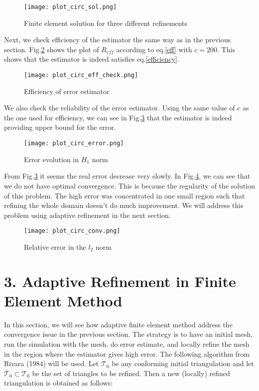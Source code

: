 \documentclass[11pt, letterpaper, hidelinks]{article}
\theoremstyle{definition}
\begin{document}
\begin{figure}[H]
    \texttt{[image: plot\_circ\_sol.png]}
    \centering
    \caption{Finite element solution for three different refinements}
    \label{fig:circ_sol}
\end{figure}

Next, we check efficiency of the estimator the same way as in the previous section. Fig.\ref{fig:circ_eff_check} shows the plot of $R_{eff}$ according to eq.\ref{eff} with $c=200$. This shows that the estimator is indeed satisfies eq.\ref{efficiency}.

\begin{figure}[H]
    \texttt{[image: plot\_circ\_eff\_check.png]}
    \centering
    \caption{Efficiency of error estimator}
    \label{fig:circ_eff_check}
\end{figure}

We also check the reliability of the error estimator. Using the same value of $c$ as the one used for efficiency, we can see in Fig.\ref{fig:circ_error} that the estimator is indeed providing upper bound for the error.

\begin{figure}[H]
    \texttt{[image: plot\_circ\_error.png]}
    \centering
    \caption{Error evolution in $H_1$ norm}
    \label{fig:circ_error}
\end{figure}
From Fig.\ref{fig:circ_error} it seems the real error decrease very slowly. In Fig.\ref{fig:circ_conv}, we can see that we do not have optimal convergence. This is because the regularity of the solution of this problem. The high error was concentrated in one small region such that refining the whole domain doesn't do much improvement. We will address this problem using adaptive refinement in the next section.
\begin{figure}[H]
    \texttt{[image: plot\_circ\_conv.png]}
    \centering
    \caption{Relative error in the $l_2$ norm}
    \label{fig:circ_conv}
\end{figure}

\section{3. Adaptive Refinement in Finite Element Method}
In this section, we will see how adaptive finite element method address the convergence issue in the previous section. The strategy is to have an initial mesh, run the simulation with the mesh, do error estimate, and locally refine the mesh in the region where the estimator gives high error. The following algorithm from Rivara (1984) will be used. Let $\mathcal{T}_0$ be any conforming initial triangulation and let $\bar{\mathcal{T}}_0 \subset \mathcal{T}_0$ be the set of triangles to be refined. Then a new (locally) refined triangulation is obtained as follows:
\end{document}
